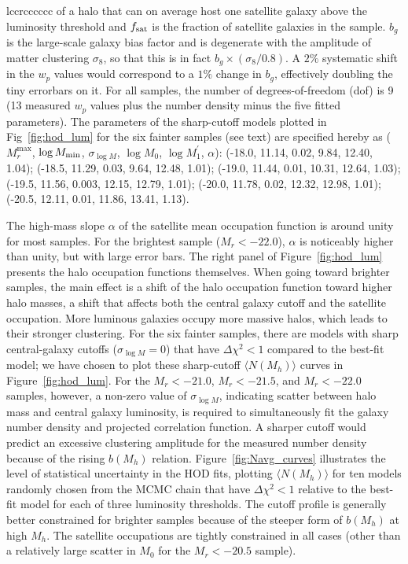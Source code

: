 \documentclass[]{emulateapj}
\def\sigM{\sigma_{\log M}}
\begin{document}
\begin{deluxetable*}{lccrcccccc}
{of a halo that can on average host one satellite galaxy above the luminosity
threshold and $f_{\rm sat}$ is the fraction of satellite galaxies in the 
sample. $b_g$ is the large-scale galaxy bias factor and is degenerate with
the amplitude of matter clustering $\sigma_8$, so that this is in fact
$b_g \times (\sigma_8/0.8)$. A $2\%$ systematic shift in the $w_p$ values
would correspond to a $1\%$ change in $b_g$, effectively doubling the tiny
errorbars on it.  
For all samples, the number of degrees-of-freedom (dof) is 9 (13 measured 
$w_p$ values plus the number density minus the five fitted parameters). 
The parameters of the sharp-cutoff models plotted in Fig~\ref{fig:hod_lum} 
for the six fainter samples (see text) are specified hereby as
($M_r^{\mathrm{max}}$, $\log M_{\rm min}$, $\sigma_{\log M}$, $\log M_0$,
$\log M_1^\prime$, $\alpha$): 
(-18.0, 11.14, 0.02, 9.84, 12.40, 1.04);
(-18.5, 11.29, 0.03, 9.64, 12.48, 1.01);
(-19.0, 11.44, 0.01, 10.31, 12.64, 1.03);
(-19.5, 11.56, 0.003, 12.15, 12.79, 1.01);
(-20.0, 11.78, 0.02, 12.32, 12.98, 1.01);
(-20.5, 12.11, 0.01, 11.86, 13.41, 1.13).
}
\end{deluxetable*}


The high-mass slope $\alpha$ of the satellite mean occupation function
is around unity for most samples. For the brightest sample
($M_r<-22.0$), $\alpha$ is noticeably higher than unity, but with large 
error bars.
%
The right panel of Figure~\ref{fig:hod_lum} presents the halo occupation 
functions themselves. When going toward brighter samples, 
the main effect is a shift of the halo occupation function toward higher halo 
masses, a shift that affects both the central galaxy cutoff and
the satellite occupation. More luminous galaxies occupy more massive halos, 
which leads to their stronger clustering.
For the six fainter samples, there are models with sharp central-galaxy 
cutoffs ($\sigM=0$) that have $\Delta\chi^2 < 1$ compared to the
best-fit model; we have chosen to plot these sharp-cutoff 
$\langle N(M_h) \rangle$ curves in Figure~\ref{fig:hod_lum}.
For the $M_r<-21.0$, $M_r<-21.5$, and $M_r<-22.0$ samples, however,
a non-zero value of $\sigM$, indicating scatter between halo mass
and central galaxy luminosity, is required to simultaneously fit
the galaxy number density and projected correlation function.
A sharper cutoff would predict an excessive clustering amplitude for
the measured number density because of the rising $b(M_h)$ relation.
Figure~\ref{fig:Navg_curves} illustrates the level of statistical
uncertainty in the HOD fits, plotting $\langle N(M_h) \rangle$ for
ten models randomly chosen from the MCMC chain
that have $\Delta\chi^2 < 1$ relative
to the best-fit model for each of three luminosity thresholds.
The cutoff profile is generally better constrained for brighter 
samples because of the steeper form of $b(M_h)$ at high $M_h$.
The satellite occupations are tightly constrained in all cases
(other than a relatively large scatter in $M_0$ for the $M_r<-20.5$ 
sample).  
 
\end{document}
